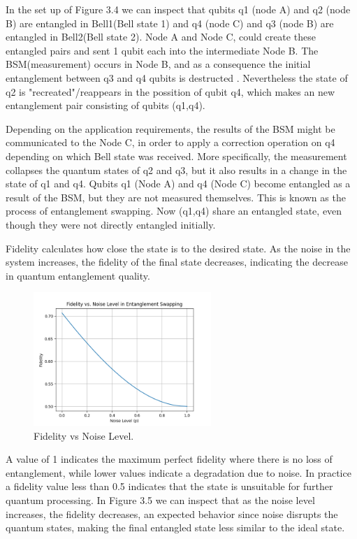 		In the set up of Figure 3.4 we can inspect that qubits q1 (node A) and q2 (node B) are
		entangled in Bell1(Bell state 1) and q4 (node C) and q3 (node B) are entangled in Bell2(Bell state 2).
		Node A and Node C, could create these entangled pairs and sent 1 qubit each into the intermediate
		Node B. The BSM(measurement) occurs in Node B, and as a consequence the initial entanglement between
		q3 and q4 qubits is destructed \cite{rfc}. Nevertheless the state of q2 is "recreated"/reappears in the possition
		of qubit q4, which makes an new entanglement pair consisting of qubits (q1,q4).

		Depending on the application requirements, the results of the BSM might be communicated to the Node C, in order
		to apply a correction operation on q4 depending on which Bell state was received. More specifically, the measurement
		collapses the quantum states of q2 and q3, but it also results in a change in the state of q1 and q4.
		Qubits q1 (Node A) and q4 (Node C) become entangled as a result of the BSM, but they are not measured themselves.
		This is known as the process of entanglement swapping. Now (q1,q4) share an entangled state, even though they 
		were not directly entangled initially.

		Fidelity calculates how close the state is to the desired state. 
		As the noise in the system increases, the fidelity of the final state decreases,
		indicating the decrease in quantum entanglement quality.

		\begin{figure}[h!]
			\centering
			\includegraphics[width=0.6\textwidth]{repeater/fid_vs_noise.png}
			\caption{Fidelity vs Noise Level.}
			\label{fig:}
		\end{figure}		

		A value of 1 indicates the maximum perfect fidelity where there is no loss of entanglement, 
		while lower values indicate a degradation due to noise.
		In practice a fidelity value less than 0.5 indicates that the state is unsuitable for further quantum processing.
		In Figure 3.5 we can inspect that as the noise level increases, the fidelity decreases,
		an expected behavior since noise disrupts the quantum states,
		making the final entangled state less similar to the ideal state.

